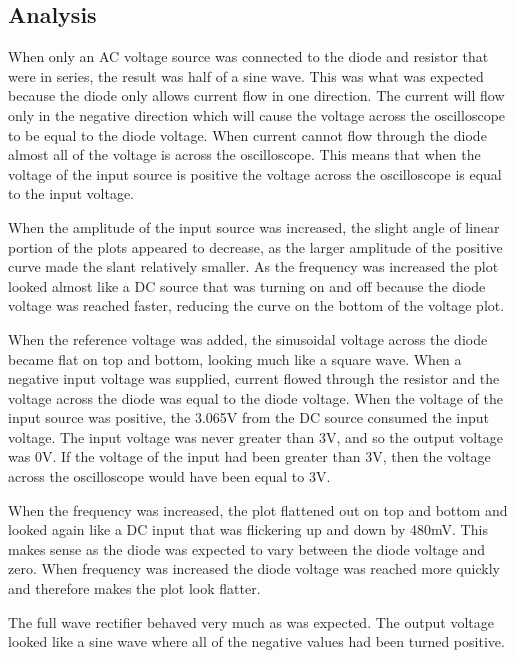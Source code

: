 \documentclass[twocolumn, amsmath]{revtex4}
\begin{document}
 
\subsection{Analysis}
When only an AC voltage source was connected to the diode and resistor that were in series, the result was half of a sine wave. This was what was expected because the diode only allows current flow in one direction. The current will flow only in the negative direction which will cause the voltage across the oscilloscope to be equal to the diode voltage. When current cannot flow through the diode almost all of the voltage is across the oscilloscope. This means that when the voltage of the input source is positive the voltage across the oscilloscope is equal to the input voltage. 

When the amplitude of the input source was increased, the slight angle of linear portion of the plots appeared to decrease, as the larger amplitude of the positive curve made the slant relatively smaller. As the frequency was increased the plot looked almost like a DC source that was turning on and off because the diode voltage was reached faster, reducing the curve on the bottom of the voltage plot.

When the reference voltage was added, the sinusoidal voltage across the diode became flat on top and bottom, looking much like a square wave. When a negative input voltage was supplied, current flowed through the resistor and the voltage across the diode %
 was equal to the diode voltage. When the voltage of the input source was positive, the 3.065V from the DC source consumed the input voltage. The input voltage was never greater than 3V, and so the output voltage was 0V. If the voltage of the input had been greater than 3V, then the voltage across the oscilloscope would have been equal to 3V.

When the frequency was increased, the plot flattened out on top and bottom and looked again like a DC input that was flickering up and down by 480mV. This makes sense as the diode was expected to vary between the diode voltage and zero. When frequency was increased the diode voltage was reached more quickly and therefore makes the plot look flatter.

The full wave rectifier behaved very much as was expected. The output voltage looked like a sine wave where all of the negative values had been turned positive. 
\end{document}
